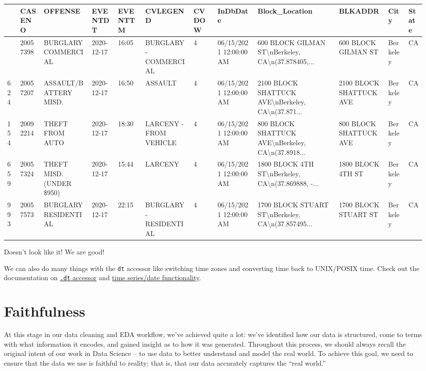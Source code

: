 \documentclass[
  letterpaper,
  DIV=11,
  numbers=noendperiod]{scrreprt}
\begin{document}
\begin{longtable}[]{@{}llllllllllll@{}}
\toprule\noalign{}
& CASENO & OFFENSE & EVENTDT & EVENTTM & CVLEGEND & CVDOW & InDbDate &
Block\_Location & BLKADDR & City & State \\
\midrule\noalign{}
\endhead
\bottomrule\noalign{}
\endlastfoot
2513 & 20057398 & BURGLARY COMMERCIAL & 2020-12-17 & 16:05 & BURGLARY -
COMMERCIAL & 4 & 06/15/2021 12:00:00 AM & 600 BLOCK GILMAN
ST\textbackslash nBerkeley, CA\textbackslash n(37.878405,... & 600 BLOCK
GILMAN ST & Berkeley & CA \\
624 & 20057207 & ASSAULT/BATTERY MISD. & 2020-12-17 & 16:50 & ASSAULT &
4 & 06/15/2021 12:00:00 AM & 2100 BLOCK SHATTUCK
AVE\textbackslash nBerkeley, CA\textbackslash n(37.871... & 2100 BLOCK
SHATTUCK AVE & Berkeley & CA \\
154 & 20092214 & THEFT FROM AUTO & 2020-12-17 & 18:30 & LARCENY - FROM
VEHICLE & 4 & 06/15/2021 12:00:00 AM & 800 BLOCK SHATTUCK
AVE\textbackslash nBerkeley, CA\textbackslash n(37.8918... & 800 BLOCK
SHATTUCK AVE & Berkeley & CA \\
659 & 20057324 & THEFT MISD. (UNDER \$950) & 2020-12-17 & 15:44 &
LARCENY & 4 & 06/15/2021 12:00:00 AM & 1800 BLOCK 4TH
ST\textbackslash nBerkeley, CA\textbackslash n(37.869888, -... & 1800
BLOCK 4TH ST & Berkeley & CA \\
993 & 20057573 & BURGLARY RESIDENTIAL & 2020-12-17 & 22:15 & BURGLARY -
RESIDENTIAL & 4 & 06/15/2021 12:00:00 AM & 1700 BLOCK STUART
ST\textbackslash nBerkeley, CA\textbackslash n(37.857495... & 1700 BLOCK
STUART ST & Berkeley & CA \\
\end{longtable}

Doesn't look like it! We are good!

We can also do many things with the \texttt{dt} accessor like switching
time zones and converting time back to UNIX/POSIX time. Check out the
documentation on
\href{https://pandas.pydata.org/docs/user_guide/basics.html\#basics-dt-accessors}{\texttt{.dt}
accessor} and
\href{https://pandas.pydata.org/docs/user_guide/timeseries.html\#}{time
series/date functionality}.

\section{Faithfulness}\label{faithfulness}

At this stage in our data cleaning and EDA workflow, we've achieved
quite a lot: we've identified how our data is structured, come to terms
with what information it encodes, and gained insight as to how it was
generated. Throughout this process, we should always recall the original
intent of our work in Data Science -- to use data to better understand
and model the real world. To achieve this goal, we need to ensure that
the data we use is faithful to reality; that is, that our data
accurately captures the ``real world.''
\end{document}
